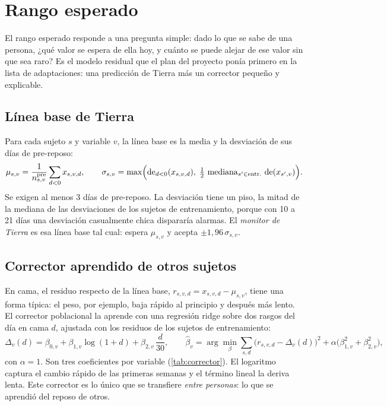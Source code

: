 \section{Rango esperado}\label{sec:rango}

El rango esperado responde a una pregunta simple: dado lo que se sabe de una persona, ¿qué valor se espera de ella hoy,
y cuánto se puede alejar de ese valor sin que sea raro? Es el modelo residual que el plan del proyecto ponía primero en
la lista de adaptaciones: una predicción de Tierra más un corrector pequeño y explicable.

\subsection{Línea base de Tierra}

Para cada sujeto $s$ y variable $v$, la línea base es la media y la desviación de sus días de pre-reposo:
\begin{equation}\label{eq:lineabase}
\mu_{s,v} = \frac{1}{n^{\text{pre}}_{s,v}} \sum_{d<0} x_{s,v,d}, \qquad
\sigma_{s,v} = \max\Bigl(\operatorname{de}_{d<0}(x_{s,v,d}),\; \tfrac{1}{2}\,\operatorname{mediana}_{s'\in\text{entr.}}\,
\operatorname{de}(x_{s',v})\Bigr).
\end{equation}
Se exigen al menos 3 días de pre-reposo. La desviación tiene un piso, la mitad de la mediana de las desviaciones de los
sujetos de entrenamiento, porque con 10 a 21 días una desviación casualmente chica dispararía alarmas. El
\emph{monitor de Tierra} es esa línea base tal cual: espera $\mu_{s,v}$ y acepta $\pm 1{,}96\,\sigma_{s,v}$.

\subsection{Corrector aprendido de otros sujetos}

En cama, el residuo respecto de la línea base, $r_{s,v,d} = x_{s,v,d} - \mu_{s,v}$, tiene una forma típica: el peso, por
ejemplo, baja rápido al principio y después más lento. El corrector poblacional la aprende con una regresión ridge
\parencite{hoerl1970} sobre dos rasgos del día en cama $d$, ajustada con los residuos de los sujetos de entrenamiento:
\begin{equation}\label{eq:corrector}
\Delta_v(d) = \beta_{0,v} + \beta_{1,v} \log(1+d) + \beta_{2,v}\, \frac{d}{30}, \qquad
\hat\beta_v = \arg\min_{\beta} \sum_{s,d} \bigl(r_{s,v,d} - \Delta_v(d)\bigr)^2 + \alpha\bigl(\beta_{1,v}^2 + \beta_{2,v}^2\bigr),
\end{equation}
con $\alpha = 1$. Son tres coeficientes por variable (\cref{tab:corrector}). El logaritmo captura el cambio rápido de
las primeras semanas y el término lineal la deriva lenta. Este corrector es lo único que se transfiere \emph{entre
personas}: lo que se aprendió del reposo de otros.

